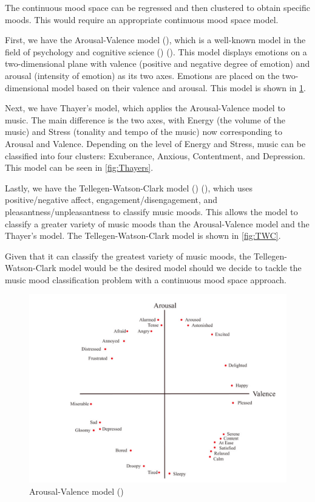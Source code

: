 The continuous mood space can be regressed and then clustered to obtain specific moods. This would require an appropriate continuous mood space model.

First, we have the Arousal-Valence model (\cite{circumplex}), which is a well-known model in the field of psychology and cognitive science (\cite{circumplexbook}) (\cite{circumplex3}). This model displays emotions on a two-dimensional plane with valence (positive and negative degree of emotion) and arousal (intensity of emotion) as its two axes. Emotions are placed on the two-dimensional model based on their valence and arousal. This model is shown in \cref{fig:circumplex}.

Next, we have Thayer's model, which applies the Arousal-Valence model to music. The main difference is the two axes, with Energy (the volume of the music) and Stress (tonality and tempo of the music) now corresponding to Arousal and Valence. Depending on the level of Energy and Stress, music can be classified into four clusters: Exuberance, Anxious, Contentment, and Depression. This model can be seen in \cref{fig:Thayers}.

Lastly, we have the Tellegen-Watson-Clark model (\cite{Watson1985}) (\cite{Tellegen1999}), which uses positive/negative affect, engagement/disengagement, and pleasantness/unpleasantness to classify music moods. This allows the model to classify a greater variety of music moods than the Arousal-Valence model and the Thayer's model. The Tellegen-Watson-Clark model is shown in \cref{fig:TWC}.

Given that it can classify the greatest variety of music moods, the Tellegen-Watson-Clark model would be the desired model should we decide to tackle the music mood classification problem with a continuous mood space approach. 

\begin{figure}
    \centering
    \includegraphics[scale=0.4]{Figures/Arousal-Valence model}
    \decoRule
    \caption{Arousal-Valence model (\cite{MoodIoT})}
    \label{fig:circumplex}
    \end{figure}


